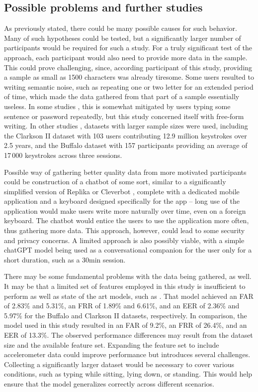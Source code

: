 \subsection{Possible problems and further studies}
As previously stated, there could be many possible causes for such behavior. Many of such hypotheses could be tested, but a significantly larger number of participants would be required for such a study. For a truly significant test of the approach, each participant would also need to provide more data in the sample. This could prove challenging, since, according participant of this study, providing a sample as small as 1500 characters was already tiresome. Some users resulted to writing semantic noise, such as repeating one or two letter for an extended period of time, which made the data gathered from that part of a sample essentially useless. In some studies \cite{Abde2023}, this is somewhat mitigated by users typing some sentence or password repeatedly, but this study concerned itself with free-form writing. In other studies \cite{Lu2020}, datasets with larger sample sizes were used, including the Clarkson II dataset with 103 users contributing 12.9 million keystrokes over 2.5 years, and the Buffalo dataset with 157 participants providing an average of 17\,000 keystrokes across three sessions.

Possible way of gathering better quality data from more motivated participants could be construction of a chatbot of some sort, similar to a significantly simplified version of Replika \cite{replika} or Cleverbot \cite{cleverbot}, complete with a dedicated mobile application and a keyboard designed specifically for the app -- long use of the application would make users write more naturally over time, even on a foreign keyboard. The chatbot would entice the users to use the application more often, thus gathering more data. This approach, however, could lead to some security and privacy concerns. A limited approach is also possibly viable, with a simple chatGPT model being used as a conversational companion for the user only for a short duration, such as a 30min session.

There may be some fundamental problems with the data being gathered, as well. It may be that a limited set of features employed in this study is insufficient to perform as well as state of the art models, such as \cite{Lu2020}. That model achieved an FAR of 2.83\% and 5.31\%, an FRR of 1.89\% and 6.61\%, and an EER of 2.36\% and 5.97\% for the Buffalo and Clarkson II datasets, respectively. In comparison, the model used in this study resulted in an FAR of 9.2\%, an FRR of 26.4\%, and an EER of 13.3\%. The observed performance differences may result from the dataset size and the available feature set. Expanding the feature set to include accelerometer data could improve performance but introduces several challenges. Collecting a significantly larger dataset would be necessary to cover various conditions, such as typing while sitting, lying down, or standing. This would help ensure that the model generalizes correctly across different scenarios.

